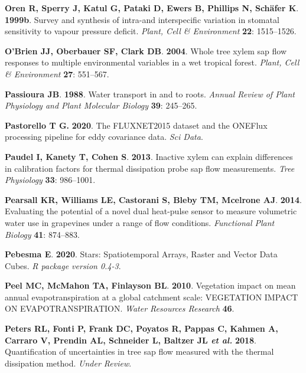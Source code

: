 \documentclass[11pt,twoside]{reedthesis}
\begin{document}
\hypertarget{ref-Oren1999}{}
\textbf{\textnormal{Oren R}, \textnormal{Sperry J}, \textnormal{Katul
G}, \textnormal{Pataki D}, \textnormal{Ewers B}, \textnormal{Phillips
N}, \textnormal{Schäfer K}}. \textbf{1999b}. Survey and synthesis of
intra-and interspecific variation in stomatal sensitivity to vapour
pressure deficit. \emph{Plant, Cell \& Environment} \textbf{22}:
1515--1526.

\hypertarget{ref-Obrien2004}{}
\textbf{\textnormal{O'Brien JJ}, \textnormal{Oberbauer SF},
\textnormal{Clark DB}}. \textbf{2004}. Whole tree xylem sap flow
responses to multiple environmental variables in a wet tropical forest.
\emph{Plant, Cell \& Environment} \textbf{27}: 551--567.

\hypertarget{ref-Passioura1988}{}
\textbf{\textnormal{Passioura JB}}. \textbf{1988}. Water transport in
and to roots. \emph{Annual Review of Plant Physiology and Plant
Molecular Biology} \textbf{39}: 245--265.

\hypertarget{ref-Pastorello2020}{}
\textbf{\textnormal{Pastorello T \textbf{G.}}} \textbf{2020}. The
FLUXNET2015 dataset and the ONEFlux processing pipeline for eddy
covariance data. \emph{Sci Data}.

\hypertarget{ref-Paudel2013}{}
\textbf{\textnormal{Paudel I}, \textnormal{Kanety T}, \textnormal{Cohen
S}}. \textbf{2013}. Inactive xylem can explain differences in
calibration factors for thermal dissipation probe sap flow measurements.
\emph{Tree Physiology} \textbf{33}: 986--1001.

\hypertarget{ref-Pearsall2014}{}
\textbf{\textnormal{Pearsall KR}, \textnormal{Williams LE},
\textnormal{Castorani S}, \textnormal{Bleby TM}, \textnormal{Mcelrone
AJ}}. \textbf{2014}. Evaluating the potential of a novel dual heat-pulse
sensor to measure volumetric water use in grapevines under a range of
flow conditions. \emph{Functional Plant Biology} \textbf{41}: 874--883.

\hypertarget{ref-pebesma_stars_2020}{}
\textbf{\textnormal{Pebesma E}}. \textbf{2020}. Stars: Spatiotemporal
Arrays, Raster and Vector Data Cubes. \emph{R package version 0.4-3}.

\hypertarget{ref-peel_vegetation_2010}{}
\textbf{\textnormal{Peel MC}, \textnormal{McMahon TA},
\textnormal{Finlayson BL}}. \textbf{2010}. Vegetation impact on mean
annual evapotranspiration at a global catchment scale: VEGETATION IMPACT
ON EVAPOTRANSPIRATION. \emph{Water Resources Research} \textbf{46}.

\hypertarget{ref-Peters2018}{}
\textbf{\textnormal{Peters RL}, \textnormal{Fonti P}, \textnormal{Frank
DC}, \textnormal{Poyatos R}, \textnormal{Pappas C}, \textnormal{Kahmen
A}, \textnormal{Carraro V}, \textnormal{Prendin AL},
\textnormal{Schneider L}, \textnormal{Baltzer JL} \emph{et al.}}
\textbf{2018}. Quantification of uncertainties in tree sap flow measured
with the thermal dissipation method. \emph{Under Review}.
\end{document}
